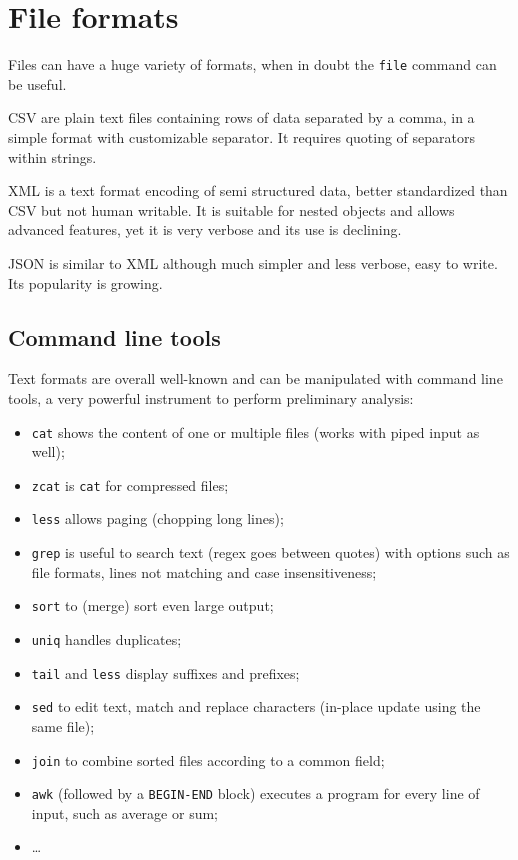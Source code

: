 \section{File formats}
Files can have a huge variety of formats, when in doubt the \texttt{file} command can be useful.

CSV are plain text files containing rows of data separated by a comma, in a simple format with customizable separator. It requires quoting of separators within strings.

XML is a text format encoding of semi structured data, better standardized than CSV but not human writable. It is suitable for nested objects and allows advanced features, yet it is very verbose and its use is declining.

JSON is similar to XML although much simpler and less verbose, easy to write. Its popularity is growing. 

\subsection{Command line tools}
Text formats are overall well-known and can be manipulated with command line tools, a very powerful instrument to perform preliminary analysis:
\begin{itemize}
	\item \texttt{cat} shows the content of one or multiple files (works with piped input as well);
	\item \texttt{zcat} is \texttt{cat} for compressed files;
	\item \texttt{less} allows paging (chopping long lines);
	\item \texttt{grep} is useful to search text (regex goes between quotes) with options such as file formats, lines not matching and case insensitiveness;
	\item \texttt{sort} to (merge) sort even large output;
	\item \texttt{uniq} handles duplicates;
	\item \texttt{tail} and \texttt{less} display suffixes and prefixes;
	\item \texttt{sed} to edit text, match and replace characters (in-place update using the same file);
	\item \texttt{join} to combine sorted files according to a common field;
	\item \texttt{awk} (followed by a \texttt{BEGIN-END} block) executes a program for every line of input, such as average or sum;
	\item \dots
\end{itemize}


